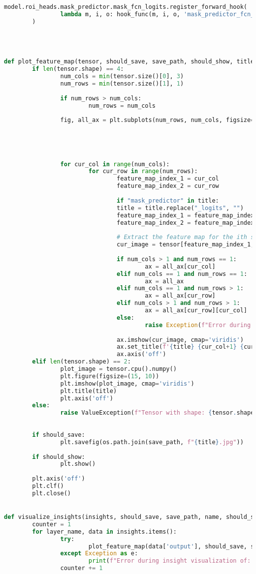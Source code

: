 \begin{lstlisting}[language=Python,caption=Hooking insight informations from Mask R-CNN, label=lst:inference-insight]
		model.roi_heads.mask_predictor.mask_fcn_logits.register_forward_hook(
				lambda m, i, o: hook_func(m, i, o, 'mask_predictor_fcn_logits')
		)




def plot_feature_map(tensor, should_save, save_path, should_show, title="Feature Map"):
		if len(tensor.shape) == 4:
				num_cols = min(tensor.size()[0], 3)
				num_rows = min(tensor.size()[1], 1)
				
				if num_rows > num_cols:
						num_rows = num_cols
				
				fig, all_ax = plt.subplots(num_rows, num_cols, figsize=(15, 10))
				
				
				
				
				
				for cur_col in range(num_cols):
						for cur_row in range(num_rows):
								feature_map_index_1 = cur_col
								feature_map_index_2 = cur_row
								
								if "mask_predictor" in title:
								title = title.replace("_logits", "")
								feature_map_index_1 = feature_map_index_1
								feature_map_index_2 = feature_map_index_2+1
								
								# Extract the feature map for the ith sample
								cur_image = tensor[feature_map_index_1, feature_map_index_2].detach().cpu().numpy()  # Select channel 0, detach from graph
								
								if num_cols > 1 and num_rows == 1:
										ax = all_ax[cur_col]
								elif num_cols == 1 and num_rows == 1:
										ax = all_ax
								elif num_cols == 1 and num_rows > 1:
										ax = all_ax[cur_row]
								elif num_cols > 1 and num_rows > 1:
										ax = all_ax[cur_row][cur_col]
								else:
										raise Exception(f"Error during col: {cur_col}, row: {cur_row}")
								
								ax.imshow(cur_image, cmap='viridis')
								ax.set_title(f'{title} {cur_col+1} {cur_row+1}')
								ax.axis('off')
		elif len(tensor.shape) == 2:
				plot_image = tensor.cpu().numpy()
				plt.figure(figsize=(15, 10))
				plt.imshow(plot_image, cmap='viridis')
				plt.title(title)
				plt.axis('off')
		else:
				raise ValueException(f"Tensor with shape: {tensor.shape} can't be plottet.")
		
		
		if should_save:
				plt.savefig(os.path.join(save_path, f"{title}.jpg"))
		
		if should_show:
				plt.show()
		
		plt.axis('off')
		plt.clf()
		plt.close()


def visualize_insights(insights, should_save, save_path, name, should_show, max_aspect_ratio=5.0, max_cols=3, channel_limit=3, batch_limit=1):
		counter = 1
		for layer_name, data in insights.items():
				try:
						plot_feature_map(data['output'], should_save, save_path, should_show, title=f"{name}_{counter:02}_{layer_name}")
				except Exception as e:
						print(f"Error during insight visualization of: {layer_name} with error: {e} and tensor: {data['output'].size()}")
				counter += 1
	\end{lstlisting}
	


